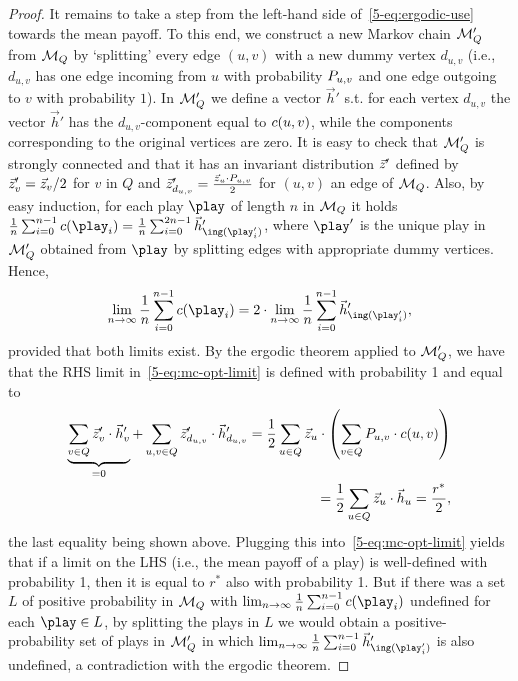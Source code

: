 \begin{proof}
It remains to take a step from the left-hand side of~\cref{5-eq:ergodic-use} towards the mean payoff. To this end, we construct a new Markov chain $\mathcal{M}_Q'$ from $\mathcal{M}_Q$ by `splitting' every edge $(u,v)$ with a new dummy vertex $d_{u,v}$ (i.e., $d_{u,v}$ has one edge incoming from $u$ with probability $P_{u,v}$ and one edge outgoing to $v$ with probability $1$). In $\mathcal{M}_Q'$ we define a vector $\vec{h}'$ s.t. for each vertex $d_{u,v}$ the vector $ \vec{h}' $ has the $ d_{u,v} $-component equal to $c(u,v)$, while the components corresponding to the original vertices are zero. It is easy to check that $\mathcal{M}_Q'$  is strongly connected and that it has an invariant distribution $\vec{z}'$ defined by $\vec{z}'_v=\vec{z}_v/2$ for $v$ in $Q$ and $\vec{z}'_{d_{u,v}}=\frac{\vec{z}_u\cdot P_{u,v}}{2}$ for $(u,v)$ an edge of $\mathcal{M}_Q$.
Also, by easy induction, for each play $\play$ of length $n$ in $\mathcal{M}_Q$ it holds $\frac{1}{n}\sum_{i=0}^{n-1}\colouring(\play_i) = \frac{1}{n}\sum_{i=0}^{2n-1}\vec{h}'_{\ing(\play_i')}$, where $\play'$ is the unique play in $\mathcal{M}_Q'$ obtained from $\play$ by splitting edges with appropriate dummy vertices. Hence, 
\begin{equation}
\label{5-eq:mc-opt-limit}
\lim_{n\rightarrow \infty}\frac{1}{n}\sum_{i=0}^{n-1}\colouring(\play_i) = 2\cdot \lim_{n\rightarrow \infty}\frac{1}{n}\sum_{i=0}^{n-1}\vec{h}'_{\ing(\play_i')},\end{equation} provided that both limits exist. By the ergodic theorem  applied to $\mathcal{M}_Q'$, we have that the RHS  limit in~\cref{5-eq:mc-opt-limit} is defined with probability 1 and equal to
\begin{align*}
\underbrace{\sum_{v\in Q} \vec{z}'_v \cdot \vec{h}'_{v}}_{=0} + \sum_{u,v\in Q} \vec{z}'_{d_{u,v}}\cdot \vec{h}'_{d_{u,v}} = \frac{1}{2}\sum_{u\in Q}\vec{z}_u\cdot\left( \sum_{v\in Q}P_{u,v}\cdot c(u,v)\right)\\ =\frac{1}{2}\sum_{u\in Q} \vec{z}_u\cdot \vec{h}_u=\frac{r^*}{2},
\end{align*}
\noindent
the last equality being shown above. Plugging this into~\cref{5-eq:mc-opt-limit} yields that if a limit on the LHS (i.e., the mean payoff of a play) is well-defined with probability 1, then it is equal to $r^*$ also with probability 1. But if there was a set $L$ of positive probability in $\mathcal{M}_Q$ with $\lim_{n \rightarrow \infty}\frac{1}{n}\sum_{i=0}^{n-1}\colouring(\play_i)$ undefined for each $\play\in L$, by splitting the plays in $L$ we would obtain a positive-probability set of plays in $\mathcal{M}_Q'$ in which $\lim_{n \rightarrow \infty}\frac{1}{n}\sum_{i=0}^{n-1}\vec{h}'_{\ing(\play_i')}$ is also undefined, a contradiction with the ergodic theorem. 

\end{proof}
